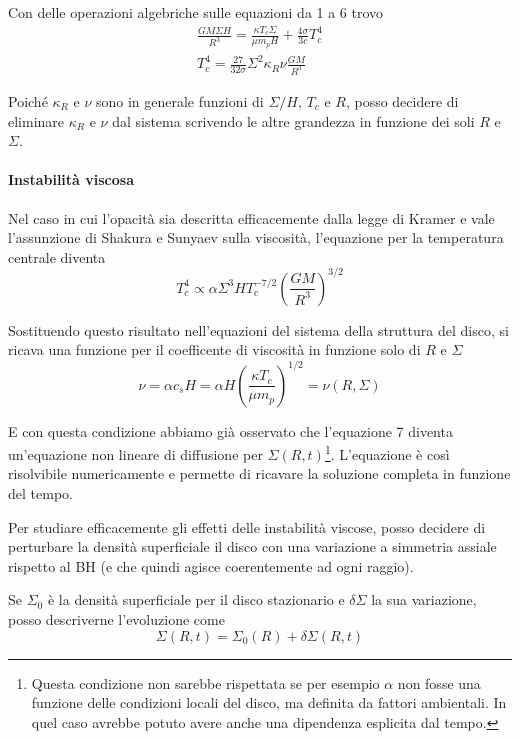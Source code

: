 \documentclass[a4paperbi]{article}
\begin{document}
	Con delle operazioni algebriche sulle equazioni da 1 a 6 trovo
	\begin{gather}
		\frac{GM\Sigma H}{R^3}=\frac{\kappa T_c\Sigma}{\mu m_p H}+\frac{4\sigma}{3c}T_c^4\\
		T^4_c=\frac{27}{32\sigma}\Sigma^2\kappa_R\nu\frac{GM}{R^3}
	\end{gather}
	
	Poiché $\kappa_R$ e $\nu$ sono in generale funzioni di $\Sigma/H$, $T_c$ e $R$, posso decidere di eliminare $\kappa_R$ e $\nu$ dal sistema scrivendo le altre grandezza in funzione dei soli $R$ e $\Sigma$.
		
	\paragraph{Instabilità viscosa}
	
	Nel caso in cui l'opacità sia descritta efficacemente dalla legge di Kramer e vale l'assunzione di Shakura e Sunyaev sulla viscosità, l'equazione per la temperatura centrale diventa
	\begin{equation*}
		T^4_c\propto\alpha\Sigma^3HT_c^{-7/2}\left(\frac{GM}{R^3}\right)^{3/2}
	\end{equation*}
	
	Sostituendo questo risultato nell'equazioni del sistema della struttura del disco, si ricava una funzione per il coefficente di viscosità in funzione solo di $R$ e $\Sigma$
	\begin{equation*}
		\nu=\alpha c_sH=\alpha H\left(\frac{\kappa T_c}{\mu m_p}\right)^{1/2}=\nu(R,\Sigma)
	\end{equation*}
	
	E con questa condizione abbiamo già osservato che l'equazione 7 diventa un'equazione non lineare di diffusione per $\Sigma(R,t)$\footnote{Questa condizione non sarebbe rispettata se per esempio $\alpha$ non fosse una funzione delle condizioni locali del disco, ma definita da fattori ambientali. In quel caso avrebbe potuto avere anche una dipendenza esplicita dal tempo.}. L'equazione è così risolvibile numericamente e permette di ricavare la soluzione completa in funzione del tempo.

	Per studiare efficacemente gli effetti delle instabilità viscose, posso decidere di perturbare la densità superficiale il disco con una variazione a simmetria assiale rispetto al BH (e che quindi agisce coerentemente ad ogni raggio).
	
	Se $\Sigma_0$ è la densità superficiale per il disco stazionario e $\delta\Sigma$ la sua variazione, posso descriverne l'evoluzione come
	\begin{equation}
		\Sigma(R,t)=\Sigma_0(R)+\delta\Sigma(R,t)
	\end{equation}
	
\end{document}
